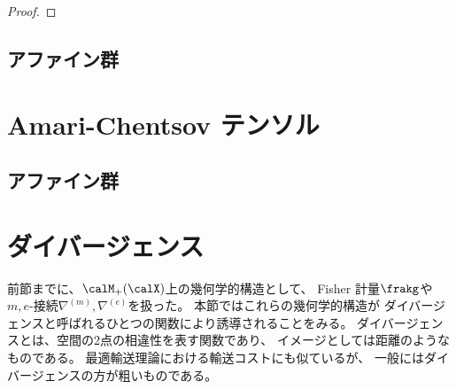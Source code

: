 \documentclass[report]{jlreq}
\begin{document}
\begin{definition}[$m, e$-接続]
    \TODO{}
\end{definition}

\begin{proposition}[$m, e$-測地線と指数写像]
    \TODO{}
\end{proposition}

\begin{proof}
    \TODO{}
\end{proof}

\subsection{アファイン群}

\TODO{}

%
\section{Amari-Chentsov テンソル}


\begin{definition}
    \TODO{}
\end{definition}

\begin{definition}[$\alpha$-接続]
    \TODO{}
\end{definition}

\subsection{アファイン群}

\TODO{}

%
\section{ダイバージェンス}

前節までに、$\calM_+(\calX)$上の幾何学的構造として、
Fisher 計量$\frakg$や$m, e$-接続$\nabla^{(m)}, \nabla^{(e)}$を扱った。
本節ではこれらの幾何学的構造が
ダイバージェンスと呼ばれるひとつの関数により誘導されることをみる。
ダイバージェンスとは、空間の2点の相違性を表す関数であり、
イメージとしては距離のようなものである。
最適輸送理論における輸送コストにも似ているが、
一般にはダイバージェンスの方が粗いものである。
\end{document}
